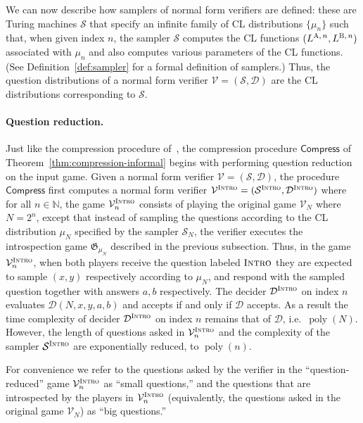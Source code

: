 \documentclass[11pt]{article}
\theoremstyle{definition}
\newcommand{\N}{\ensuremath{\mathbb{N}}}
\DeclareMathOperator{\poly}{poly}
\newcommand{\game}{\mathfrak{G}}
\newcommand{\sampler}{\mathcal{S}}
\newcommand{\decider}{\mathcal{D}}
\newcommand{\verifier}{\mathcal{V}}
\newcommand{\gamestyle}[1]{\ensuremath{\textsc{#1}}\xspace}
\newcommand{\intro}{\gamestyle{Intro}}
\newcommand{\labelstyle}[1]{\ensuremath{\textsc{#1}}\xspace}
\newcommand{\alice}{\labelstyle{A}}
\newcommand{\bob}{\labelstyle{B}}
\newcommand{\typestyle}[1]{\ensuremath{\textsc{#1}}\xspace}
\newcommand{\Intro}{\typestyle{Intro}}
\newcommand{\tmstyle}[1]{\ensuremath{\mathsf{#1}}}
\newcommand{\Compress}{\tmstyle{Compress}}
\begin{document}
We can now describe how samplers of normal form verifiers are defined: these are
Turing machines $\sampler$ that specify an infinite family of CL distributions
$\{ \mu_n \}$ such that, when given index $n$, the sampler $\sampler$ computes
the CL functions $(L^{\alice,\, n},L^{\bob,\, n})$ associated with $\mu_n$ and
also computes various parameters of the CL functions.
(See Definition~\ref{def:sampler} for a formal definition of samplers.)
Thus, the question distributions of a normal form verifier $\verifier =
(\sampler,\decider)$ are the CL distributions corresponding to $\sampler$.

    
    
\paragraph{Question reduction.} Just like the compression procedure of~\cite{NW19}, the compression procedure $\Compress$ of Theorem~\ref{thm:compression-informal} begins with performing question reduction on the input game. Given a normal form verifier $\verifier = (\sampler,\decider)$, the procedure $\Compress$ first computes a normal form verifier $\verifier^\intro = (\sampler^\intro,\decider^\intro)$ where for all $n \in \N$, the game $\verifier^\intro_n$ consists of playing the original game $\verifier_N$ where $N = 2^n$, except that instead of sampling the questions according to the CL distribution $\mu_N$ specified by the sampler $\sampler_N$, the verifier executes the introspection game $\game_{\mu_N}$  described in the previous subsection. Thus, in the game $\verifier^\intro_n$, when both players receive the question labeled $\Intro$ they are expected to sample $(x,y)$ respectively according to $\mu_N$, and respond with the sampled question together with answers $a,b$ respectively. The decider $\decider^\intro$ on index $n$ evaluates $\decider(N,x,y,a,b)$ and accepts if and only if $\decider$ accepts. As a result the time complexity of decider $\decider^\intro$ on index $n$ remains that of $\decider$, i.e.\ $\poly(N)$. However, the length of questions asked in $\verifier^\intro_n$ and the complexity of the sampler $\sampler^\intro$ are exponentially reduced, to $\poly(n)$.

For convenience we refer to the questions asked by the verifier in the ``question-reduced'' game $\verifier^\intro_n$ as ``small questions,'' and the questions that are introspected by the players in $\verifier^\intro_n$ (equivalently, the questions asked in the original game $\verifier_N$) as ``big questions.'' 
\end{document}
